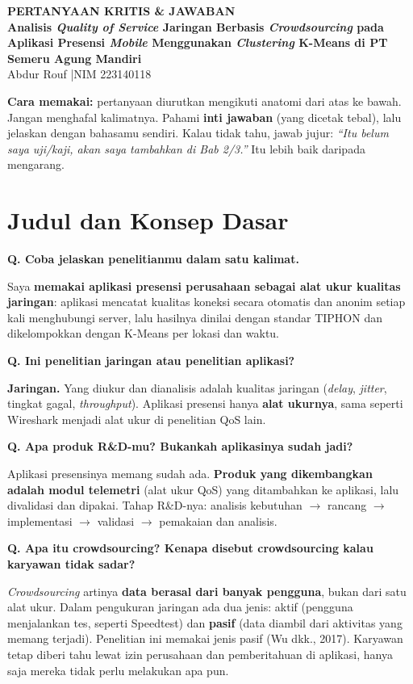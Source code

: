 \documentclass[11pt,a4paper]{article}
\newcounter{q}
\newcommand{\tanya}[2]{\stepcounter{q}%
\par\vspace{6pt}\noindent\colorbox{band}{\parbox{\dimexpr\linewidth-2\fboxsep}{\textbf{Q\arabic{q}. #1}}}\par\vspace{2pt}#2\par}
\begin{document}
\begin{center}
{\Large\bfseries\color{head} PERTANYAAN KRITIS \& JAWABAN}\\[4pt]
{\bfseries Analisis \textit{Quality of Service} Jaringan Berbasis \textit{Crowdsourcing} pada Aplikasi Presensi \textit{Mobile} Menggunakan \textit{Clustering} K-Means di PT Semeru Agung Mandiri}\\[4pt]
Abdur Rouf \quad|\quad NIM 223140118
\end{center}

\textbf{Cara memakai:} pertanyaan diurutkan mengikuti anatomi dari atas ke bawah. Jangan menghafal kalimatnya. Pahami \textbf{inti jawaban} (yang dicetak tebal), lalu jelaskan dengan bahasamu sendiri. Kalau tidak tahu, jawab jujur: \textit{``Itu belum saya uji/kaji, akan saya tambahkan di Bab 2/3.''} Itu lebih baik daripada mengarang.

\section{Judul dan Konsep Dasar}

\tanya{Coba jelaskan penelitianmu dalam satu kalimat.}{Saya \textbf{memakai aplikasi presensi perusahaan sebagai alat ukur kualitas jaringan}: aplikasi mencatat kualitas koneksi secara otomatis dan anonim setiap kali menghubungi server, lalu hasilnya dinilai dengan standar TIPHON dan dikelompokkan dengan K-Means per lokasi dan waktu.}

\tanya{Ini penelitian jaringan atau penelitian aplikasi?}{\textbf{Jaringan.} Yang diukur dan dianalisis adalah kualitas jaringan (\textit{delay}, \textit{jitter}, tingkat gagal, \textit{throughput}). Aplikasi presensi hanya \textbf{alat ukurnya}, sama seperti Wireshark menjadi alat ukur di penelitian QoS lain.}

\tanya{Apa produk R\&D-mu? Bukankah aplikasinya sudah jadi?}{Aplikasi presensinya memang sudah ada. \textbf{Produk yang dikembangkan adalah modul telemetri} (alat ukur QoS) yang ditambahkan ke aplikasi, lalu divalidasi dan dipakai. Tahap R\&D-nya: analisis kebutuhan $\rightarrow$ rancang $\rightarrow$ implementasi $\rightarrow$ validasi $\rightarrow$ pemakaian dan analisis.}

\tanya{Apa itu crowdsourcing? Kenapa disebut crowdsourcing kalau karyawan tidak sadar?}{\textit{Crowdsourcing} artinya \textbf{data berasal dari banyak pengguna}, bukan dari satu alat ukur. Dalam pengukuran jaringan ada dua jenis: aktif (pengguna menjalankan tes, seperti Speedtest) dan \textbf{pasif} (data diambil dari aktivitas yang memang terjadi). Penelitian ini memakai jenis pasif (Wu dkk., 2017). Karyawan tetap diberi tahu lewat izin perusahaan dan pemberitahuan di aplikasi, hanya saja mereka tidak perlu melakukan apa pun.}
\end{document}
